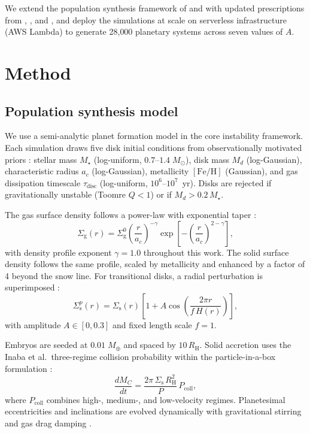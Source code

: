 \documentclass[twocolumn]{aastex631}
\newcommand{\Mearth}{M_\oplus}
\newcommand{\Msun}{M_\odot}
\newcommand{\Mstar}{M_\star}
\newcommand{\Rhill}{R_\mathrm{H}}
\newcommand{\Sigmag}{\Sigma_\mathrm{g}}
\newcommand{\Sigmas}{\Sigma_\mathrm{s}}
\begin{document}
We extend the population synthesis framework of \citet{Miguel2011} and
\citet{Chaparro2019} with updated prescriptions from \citet{Guilera2010},
\citet{IdaLin2004a}, and \citet{Fortier2013}, and deploy the simulations at
scale on serverless infrastructure (AWS Lambda) to generate 28{,}000 planetary
systems across seven values of $A$.

\section{Method}
\label{sec:method}

\subsection{Population synthesis model}
\label{sec:model}

We use a semi-analytic planet formation model in the core instability
framework.  Each simulation draws five disk initial conditions from
observationally motivated priors \citep{Miguel2011}: stellar mass $\Mstar$
(log-uniform, $0.7$--$1.4\;\Msun$), disk mass $M_d$ (log-Gaussian),
characteristic radius $a_c$ (log-Gaussian), metallicity $[\text{Fe/H}]$
(Gaussian), and gas dissipation timescale $\tau_\text{disc}$ (log-uniform,
$10^6$--$10^7$~yr).  Disks are rejected if gravitationally unstable (Toomre
$Q < 1$) or if $M_d > 0.2\,\Mstar$.

The gas surface density follows a power-law with exponential taper
\citep{Andrews2009}:
\begin{equation}
\Sigmag(r) = \Sigmag^0 \left(\frac{r}{a_c}\right)^{-\gamma}
\exp\left[-\left(\frac{r}{a_c}\right)^{2-\gamma}\right],
\end{equation}
with density profile exponent $\gamma = 1.0$ throughout this work.  The solid
surface density follows the same profile, scaled by metallicity and enhanced
by a factor of 4 beyond the snow line.  For transitional disks, a radial
perturbation is superimposed \citep{Chaparro2019, Pinilla2012}:
\begin{equation}
\Sigmas^p(r) = \Sigmas(r)\left[1 + A\cos\left(\frac{2\pi r}{f\,H(r)}
\right)\right],
\label{eq:perturbation}
\end{equation}
with amplitude $A \in [0, 0.3]$ and fixed length scale $f = 1$.

Embryos are seeded at $0.01\;\Mearth$ \citep{Fortier2013} and spaced by
$10\,\Rhill$.  Solid accretion uses the Inaba et al.\ three-regime collision
probability \citep{Inaba2001} within the particle-in-a-box formulation
\citep{Guilera2010}:
\begin{equation}
\frac{dM_C}{dt} = \frac{2\pi\,\Sigmas\,\Rhill^2}{P}\,P_\text{coll},
\end{equation}
where $P_\text{coll}$ combines high-, medium-, and low-velocity regimes.
Planetesimal eccentricities and inclinations are evolved dynamically with
gravitational stirring \citep{Ohtsuki2002} and gas drag damping
\citep{Adachi1976}.
\end{document}
